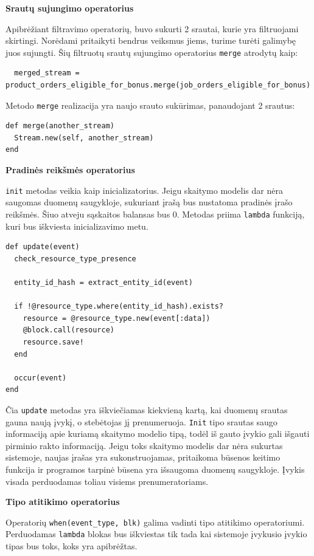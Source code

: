 \textbf{Srautų sujungimo operatorius}

Apibrėžiant filtravimo operatorių, buvo sukurti 2 srautai, kurie yra filtruojami skirtingi. Norėdami pritaikyti bendrus veiksmus jiems, turime turėti galimybę juos sujungti. Šių filtruotų srautų sujungimo operatorius \lstinline|merge| atrodytų kaip:

\begin{lstlisting}
  merged_stream = product_orders_eligible_for_bonus.merge(job_orders_eligible_for_bonus)
\end{lstlisting}

Metodo \lstinline|merge| realizacija yra naujo srauto sukūrimas, panaudojant 2 srautus:

\begin{lstlisting}
def merge(another_stream)
  Stream.new(self, another_stream)
end
\end{lstlisting}

\textbf{Pradinės reikšmės operatorius}

\lstinline|init| metodas veikia kaip inicializatorius. Jeigu skaitymo modelis dar nėra saugomas duomenų saugykloje, sukuriant įrašą bus nustatoma pradinės įrašo reikšmės. Šiuo atveju sąskaitos balansas bus 0. Metodas priima \lstinline|lambda| funkciją, kuri bus iškviesta inicializavimo metu.

\begin{lstlisting}
def update(event)
  check_resource_type_presence

  entity_id_hash = extract_entity_id(event)

  if !@resource_type.where(entity_id_hash).exists?
    resource = @resource_type.new(event[:data])
    @block.call(resource)
    resource.save!
  end

  occur(event)
end
\end{lstlisting}

Čia \lstinline|update| metodas yra iškviečiamas kiekvieną kartą, kai duomenų srautas gauna naują įvykį, o stebėtojas jį prenumeruoja. \lstinline|Init| tipo srautas saugo informaciją apie kuriamą skaitymo modelio tipą, todėl iš gauto įvykio gali išgauti pirminio rakto informaciją. Jeigu toks skaitymo modelis dar nėra sukurtas sistemoje, naujas įrašas yra sukonstruojamas, pritaikoma būsenos keitimo funkcija ir programos tarpinė būsena yra išsaugoma duomenų saugykloje. Įvykis visada perduodamas toliau visiems prenumeratoriams.

\textbf{Tipo atitikimo operatorius}

Operatorių \lstinline|when(event_type, blk)| galima vadinti tipo atitikimo operatoriumi. Perduodamas \lstinline|lambda| blokas bus iškviestas tik tada kai sistemoje įvykusio įvykio tipas bus toks, koks yra apibrėžtas.

